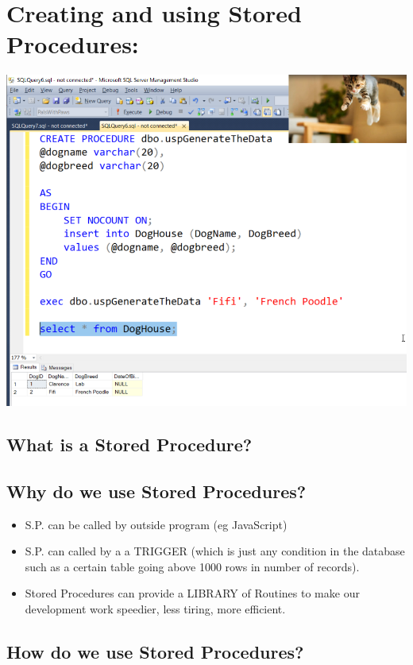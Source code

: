 \newpage
\section {Creating and using Stored Procedures:}
\includegraphics[]{images/Running Stored Procedures.png}
\subsection {What is a Stored Procedure?}

\subsection{Why do we use Stored Procedures?}
\begin{itemize}
    \item S.P. can be called by outside program (eg JavaScript)
    \item S.P. can called by a a TRIGGER (which is just any condition in the database
    such as a certain table going above 1000 rows in number of records).
    \item Stored Procedures can provide a LIBRARY of Routines to make our development
    work speedier, less tiring, more efficient.
\end{itemize}

\subsection{How do we use Stored Procedures?}

